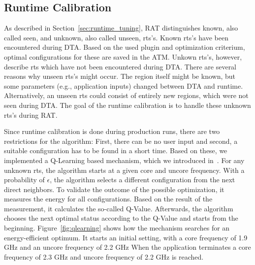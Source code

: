 \subsection{Runtime Calibration} \label{sec:calibration}

As described in Section~\ref{sec:runtime_tuning}, RAT distinguishes known, also called seen, and unknown, also called unseen, rts's.
Known rts's have been encountered during DTA.
Based on the used plugin and optimization criterium, optimal configurations for these are saved in the ATM.
Unkown rts's, however, describe rts which have not been encountered during DTA.
There are several reasons why unseen rts's might occur.
The region itself might be known, but some parameters (e.g., application inputs) changed between DTA and runtime.
Alternatively, an unseen rts could consist of entirely new regions, which were not seen during DTA.
The goal of the runtime calibration is to handle these unknown rts's during RAT.

Since runtime calibration is done during production runs, there are two restrictions for the algorithm:
First, there can be no user input and second, a suitable configuration has to be found in a short time.
Based on these, we implemented a Q-Learning based mechanism, which we introduced in~\cite{Gocht2019a}.
For any unknown rts, the algorithm starts at a given core and uncore frequency.
With a probability of {$\epsilon$}, the algorithm selects a different configuration from the next direct neighbors.
To validate the outcome of the possible optimization, it measures the energy for all configurations.
Based on the result of the measurement, it calculates the so-called Q-Value.
Afterwards, the algorithm chooses the next optimal status according to the Q-Value and starts from the beginning.
Figure~\ref{fig:qlearning} shows how the mechanism searches for an energy-efficient optimum.
It starts an initial setting, with a core frequency of 1.9 GHz and an uncore frequency of 2.2 GHz
When the application terminates a core frequency of 2.3 GHz and uncore frequency of 2.2 GHz is reached.

